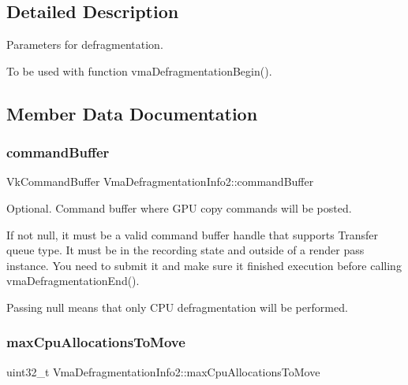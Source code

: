 \subsection{Detailed Description}
Parameters for defragmentation. 

To be used with function vma\+Defragmentation\+Begin(). 

\subsection{Member Data Documentation}
\mbox{\label{structVmaDefragmentationInfo2_a7f71f39590c5316771493d2333f9c1bd}} 
\subsubsection{\texorpdfstring{command\+Buffer}{commandBuffer}}
{\footnotesize\ttfamily Vk\+Command\+Buffer Vma\+Defragmentation\+Info2\+::command\+Buffer}



Optional. Command buffer where G\+PU copy commands will be posted. 

If not null, it must be a valid command buffer handle that supports Transfer queue type. It must be in the recording state and outside of a render pass instance. You need to submit it and make sure it finished execution before calling vma\+Defragmentation\+End().

Passing null means that only C\+PU defragmentation will be performed. \mbox{\label{structVmaDefragmentationInfo2_a94c2c7223d52878445a8cccce396b671}} 
\subsubsection{\texorpdfstring{max\+Cpu\+Allocations\+To\+Move}{maxCpuAllocationsToMove}}
{\footnotesize\ttfamily uint32\+\_\+t Vma\+Defragmentation\+Info2\+::max\+Cpu\+Allocations\+To\+Move}



